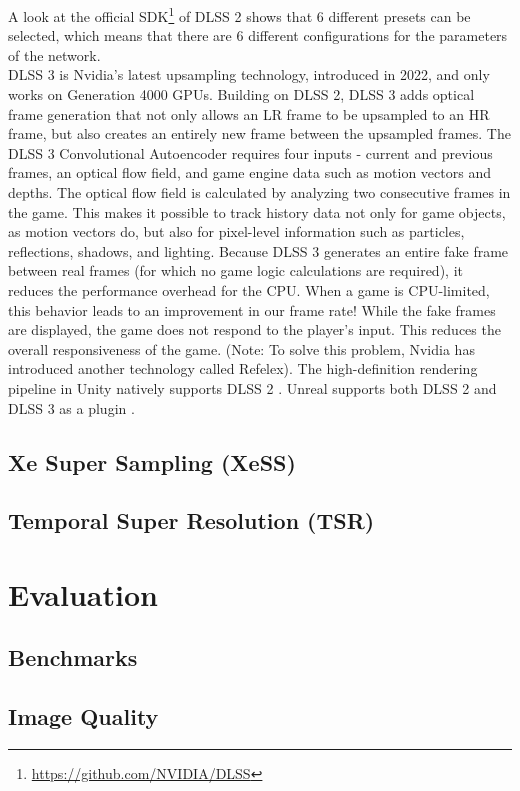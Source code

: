\documentclass[letterpaper, 10 pt, conference]{ieeeconf}  %
\begin{document}
A look at the official SDK\footnote{\url{https://github.com/NVIDIA/DLSS}} of DLSS 2 shows that 6 different presets can be selected, which means that there are 6 different configurations for the parameters of the network. \\
DLSS 3 is Nvidia's latest upsampling technology, introduced in 2022, and only works on Generation 4000 GPUs.
Building on DLSS 2, DLSS 3 adds optical frame generation that not only allows an LR frame to be upsampled to an HR frame, but also creates an entirely new frame between the upsampled frames.
The DLSS 3 Convolutional Autoencoder requires four inputs - current and previous frames, an optical flow field, and game engine data such as motion vectors and depths.
The optical flow field is calculated by analyzing two consecutive frames in the game.
This makes it possible to track history data not only for game objects, as motion vectors do, but also for pixel-level information such as particles, reflections, shadows, and lighting.
Because DLSS 3 generates an entire fake frame between real frames (for which no game logic calculations are required), it reduces the performance overhead for the CPU.
When a game is CPU-limited, this behavior leads to an improvement in our frame rate!
While the fake frames are displayed, the game does not respond to the player's input.
This reduces the overall responsiveness of the game.
(Note: To solve this problem, Nvidia has introduced another technology called Refelex).
The high-definition rendering pipeline in Unity natively supports DLSS 2 \cite{dlss_unity}.
Unreal supports both DLSS 2 and DLSS 3 as a plugin \cite{dlss_unreal}.

\subsection{Xe Super Sampling (XeSS)}
\subsection{Temporal Super Resolution (TSR)}

\section{Evaluation}
\label{Sec:Evaluation}
\subsection{Benchmarks}
\subsection{Image Quality}
\end{document}
